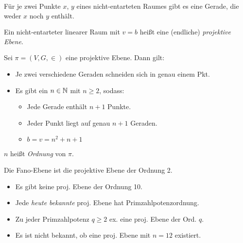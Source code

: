 \documentclass{cheat-sheet}
\begin{document}
\begin{lem}
  Für je zwei Punkte $x$, $y$ eines nicht-entarteten Raumes gibt es eine Gerade, die weder $x$ noch $y$ enthält.
\end{lem}

\begin{defn}
  Ein nicht-entarteter linearer Raum mit $v = b$ heißt eine (endliche) \emph{projektive Ebene}.
\end{defn}

\begin{satz}
  Sei $\pi = (V, G, {\in})$ eine projektive Ebene.
  Dann gilt:
  \begin{itemize}
    \item Je zwei verschiedene Geraden schneiden sich in genau einem Pkt.
    \item Es gibt ein $n \in \mathbb{N}$ mit $n \geq 2$, sodass:
    \begin{itemize}
      \item Jede Gerade enthält $n+1$ Punkte.
      \item Jeder Punkt liegt auf genau $n+1$ Geraden.
      \item $b = v = n^2 + n + 1$
    \end{itemize}
  \end{itemize}
\end{satz}

\begin{defn}
  $n$ heißt \emph{Ordnung} von $\pi$.
\end{defn}

\begin{bsp}
  Die Fano-Ebene ist die projektive Ebene der Ordnung 2.
\end{bsp}



\begin{fakten}
  \begin{itemize}
    \item Es gibt keine proj. Ebene der Ordnung 10.
    \item Jede \textit{heute bekannte} proj. Ebene hat Primzahlpotenzordnung.
    \item Zu jeder Primzahlpotenz $q \geq 2$ ex. eine proj. Ebene der Ord. $q$.
    \item Es ist nicht bekannt, ob eine proj. Ebene mit $n = 12$ existiert.
  \end{itemize}
\end{fakten}
\end{document}
